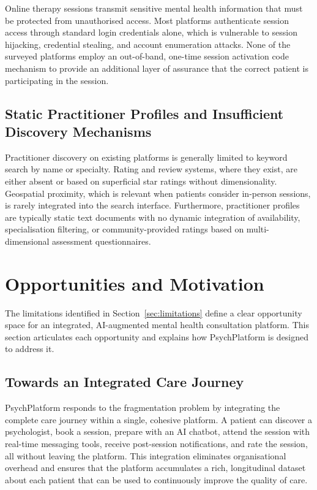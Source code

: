 Online therapy sessions transmit sensitive mental health information that must be
protected from unauthorised access. Most platforms authenticate session access
through standard login credentials alone, which is vulnerable to session
hijacking, credential stealing, and account enumeration attacks. None of the
surveyed platforms employ an out-of-band, one-time session activation code
mechanism to provide an additional layer of assurance that the correct patient is
participating in the session.

\subsection{Static Practitioner Profiles and Insufficient Discovery Mechanisms}

Practitioner discovery on existing platforms is generally limited to keyword
search by name or specialty. Rating and review systems, where they exist, are
either absent or based on superficial star ratings without dimensionality.
Geospatial proximity, which is relevant when patients consider in-person
sessions, is rarely integrated into the search interface. Furthermore,
practitioner profiles are typically static text documents with no dynamic
integration of availability, specialisation filtering, or community-provided
ratings based on multi-dimensional assessment questionnaires.

\section{Opportunities and Motivation}
\label{sec:opportunities}

The limitations identified in Section~\ref{sec:limitations} define a clear
opportunity space for an integrated, AI-augmented mental health consultation
platform. This section articulates each opportunity and explains how PsychPlatform
is designed to address it.

\subsection{Towards an Integrated Care Journey}

PsychPlatform responds to the fragmentation problem by integrating the complete
care journey within a single, cohesive platform. A patient can discover a
psychologist, book a session, prepare with an AI chatbot, attend the session
with real-time messaging tools, receive post-session notifications, and rate the
session, all without leaving the platform. This integration eliminates
organisational overhead and ensures that the platform accumulates a rich,
longitudinal dataset about each patient that can be used to continuously improve
the quality of care.

